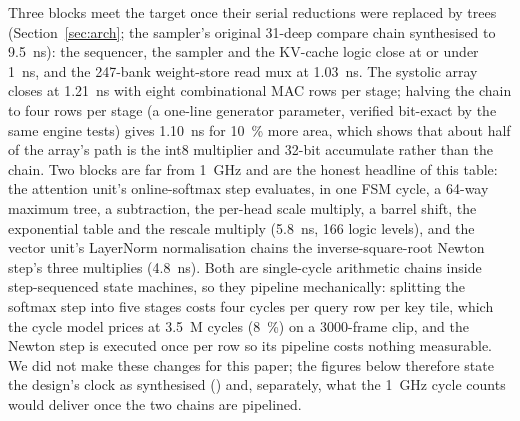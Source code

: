 Three blocks meet the target once their serial reductions were replaced by trees (Section~\ref{sec:arch}; the sampler's original 31-deep compare chain synthesised to \SI{9.5}{ns}): the sequencer, the sampler and the KV-cache logic close at or under \SI{1}{ns}, and the 247-bank weight-store read mux at \SI{1.03}{ns}. The systolic array closes at \SI{1.21}{ns} with eight combinational MAC rows per stage; halving the chain to four rows per stage (a one-line generator parameter, verified bit-exact by the same engine tests) gives \SI{1.10}{ns} for \SI{10}{\percent} more area, which shows that about half of the array's path is the int8 multiplier and 32-bit accumulate rather than the chain. Two blocks are far from \SI{1}{GHz} and are the honest headline of this table: the attention unit's online-softmax step evaluates, in one FSM cycle, a 64-way maximum tree, a subtraction, the per-head scale multiply, a barrel shift, the exponential table and the rescale multiply (\SI{5.8}{ns}, 166 logic levels), and the vector unit's LayerNorm normalisation chains the inverse-square-root Newton step's three multiplies (\SI{4.8}{ns}). Both are single-cycle arithmetic chains inside step-sequenced state machines, so they pipeline mechanically: splitting the softmax step into five stages costs four cycles per query row per key tile, which the cycle model prices at \SI{3.5}{M} cycles (\SI{8}{\percent}) on a 3000-frame clip, and the Newton step is executed once per row so its pipeline costs nothing measurable. We did not make these changes for this paper; the figures below therefore state the design's clock as synthesised (\fmaxAll) and, separately, what the \SI{1}{GHz} cycle counts would deliver once the two chains are pipelined.